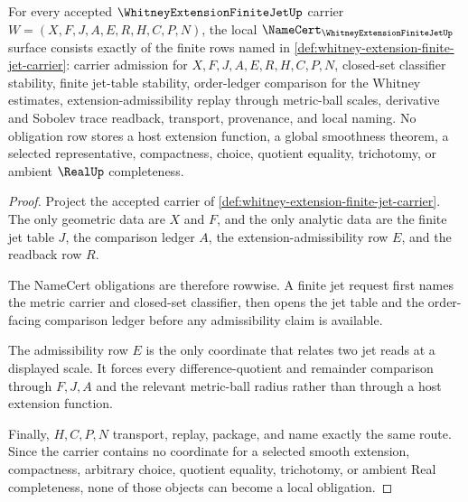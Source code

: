 \begin{theorem}
\label{thm:whitney-extension-finite-jet-namecert-obligations}
For every accepted $\WhitneyExtensionFiniteJetUp$ carrier $W=(X,F,J,A,E,R,H,C,P,N)$, the local $\NameCert_{\WhitneyExtensionFiniteJetUp}$ surface consists exactly of the finite rows named in \autoref{def:whitney-extension-finite-jet-carrier}: carrier admission for $X,F,J,A,E,R,H,C,P,N$, closed-set classifier stability, finite jet-table stability, order-ledger comparison for the Whitney estimates, extension-admissibility replay through metric-ball scales, derivative and Sobolev trace readback, transport, provenance, and local naming. No obligation row stores a host extension function, a global smoothness theorem, a selected representative, compactness, choice, quotient equality, trichotomy, or ambient $\RealUp$ completeness.
\end{theorem}
\begin{proof}
Project the accepted carrier of \autoref{def:whitney-extension-finite-jet-carrier}. The only geometric data are $X$ and $F$, and the only analytic data are the finite jet table $J$, the comparison ledger $A$, the extension-admissibility row $E$, and the readback row $R$.

The NameCert obligations are therefore rowwise. A finite jet request first names the metric carrier and closed-set classifier, then opens the jet table and the order-facing comparison ledger before any admissibility claim is available.

The admissibility row $E$ is the only coordinate that relates two jet reads at a displayed scale. It forces every difference-quotient and remainder comparison through $F,J,A$ and the relevant metric-ball radius rather than through a host extension function.

Finally, $H,C,P,N$ transport, replay, package, and name exactly the same route. Since the carrier contains no coordinate for a selected smooth extension, compactness, arbitrary choice, quotient equality, trichotomy, or ambient Real completeness, none of those objects can become a local obligation.
\end{proof}

